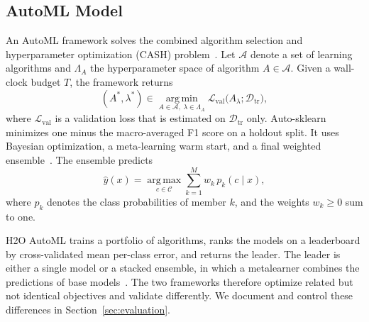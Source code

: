 \subsection{AutoML Model}
An AutoML framework solves the combined algorithm selection and hyperparameter optimization (CASH) problem~\cite{thornton2013}. Let $\mathcal{A}$ denote a set of learning algorithms and $\Lambda_A$ the hyperparameter space of algorithm $A\in\mathcal{A}$. Given a wall-clock budget $T$, the framework returns
\begin{equation}
(A^{*},\lambda^{*}) \in \operatorname*{arg\,min}_{A\in\mathcal{A},\;\lambda\in\Lambda_A} \mathcal{L}_{\mathrm{val}}\big(A_{\lambda};\mathcal{D}_{\mathrm{tr}}\big),
\label{eq:cash}
\end{equation}
where $\mathcal{L}_{\mathrm{val}}$ is a validation loss that is estimated on $\mathcal{D}_{\mathrm{tr}}$ only. Auto-sklearn minimizes one minus the macro-averaged F1 score on a holdout split. It uses Bayesian optimization, a meta-learning warm start, and a final weighted ensemble~\cite{feurer2015}. The ensemble predicts
\begin{equation}
\hat{y}(x)=\operatorname*{arg\,max}_{c\in\mathcal{C}}\sum_{k=1}^{M} w_k\,p_k(c\mid x),
\label{eq:ensemble}
\end{equation}
where $p_k$ denotes the class probabilities of member $k$, and the weights $w_k\ge 0$ sum to one.

H2O AutoML trains a portfolio of algorithms, ranks the models on a leaderboard by cross-validated mean per-class error, and returns the leader. The leader is either a single model or a stacked ensemble, in which a metalearner combines the predictions of base models~\cite{ledell2020}. The two frameworks therefore optimize related but not identical objectives and validate differently. We document and control these differences in Section~\ref{sec:evaluation}.

